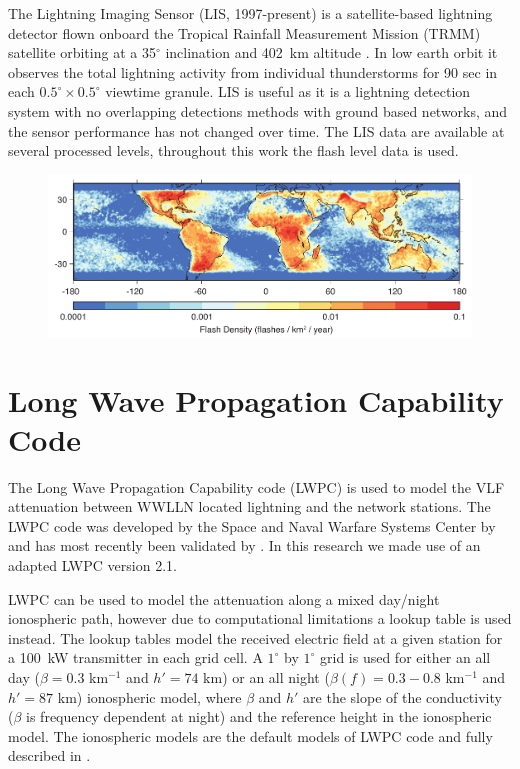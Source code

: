 The Lightning Imaging Sensor (LIS, 1997-present) is a satellite-based lightning detector flown onboard the Tropical Rainfall Measurement Mission (TRMM) satellite orbiting at a 35$^\circ$ inclination and 402~km altitude \citep{Christian1999}.
In low earth orbit it observes the total lightning activity from individual thunderstorms for 90 sec in each $0.5^\circ \times 0.5^\circ$ viewtime granule.
LIS is useful as it is a lightning detection system with no overlapping detections methods with ground based networks, and the sensor performance has not changed over time.
The LIS data are available at several processed levels, throughout this work the flash level data is used.

\begin{figure}[ht!]
	\centering
	\includegraphics[scale=1]{Introduction/Figures/lis_density.pdf}\\
	\caption{ }
	\label{intro:fig:lis}
\end{figure}

\section{Long Wave Propagation Capability Code}

The Long Wave Propagation Capability code (LWPC) is used to model the VLF attenuation between WWLLN located lightning and the network stations.
The LWPC code was developed by the Space and Naval Warfare Systems Center by \citet{Ferguson1998} and has most recently been validated by \citet{McRae2000d, Thomson2011}.
In this research we made use of an adapted LWPC version 2.1.

LWPC can be used to model the attenuation along a mixed day/night ionospheric path, however due to computational limitations a lookup table is used instead.
The lookup tables model the received electric field at a given station for a 100~kW transmitter in each grid cell.
A $1^{\circ}$ by $1^{\circ}$ grid is used for either an all day ($\beta=0.3$ km$^{-1}$ and $h'=74$ km) or an all night ($\beta(f)=0.3-0.8$ km$^{-1}$ and $h'=87$ km) ionospheric model, where $\beta$ and $h'$ are the slope of the conductivity ($\beta$ is frequency dependent at night) and the reference height in the ionospheric model.
The ionospheric models are the default models of LWPC code and fully described in \citet{Ferguson1998}. 


